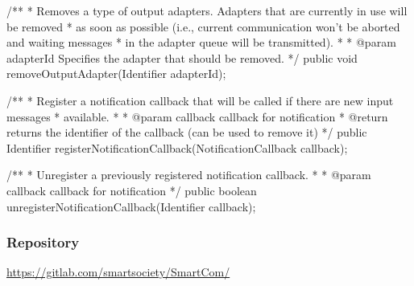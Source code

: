     /**
     * Removes a type of output adapters. Adapters that are currently in use will be removed
     * as soon as possible (i.e., current communication won’t be aborted and waiting messages
     * in the adapter queue will be transmitted).
     *
     * @param adapterId Specifies the adapter that should be removed.
     */
    public void removeOutputAdapter(Identifier adapterId);

    /**
     * Register a notification callback that will be called if there are new input messages
     * available.
     *
     * @param callback callback for notification
     * @return returns the identifier of the callback (can be used to remove it)
     */
    public Identifier registerNotificationCallback(NotificationCallback callback);

    /**
     * Unregister a previously registered notification callback.
     *
     * @param callback callback for notification
     */
    public boolean unregisterNotificationCallback(Identifier callback);
\subsubsection{Repository}
\url{https://gitlab.com/smartsociety/SmartCom/}
